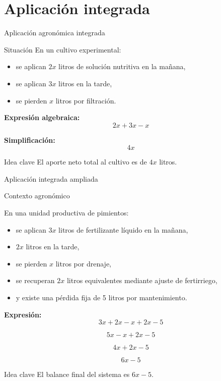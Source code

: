\documentclass[aspectratio=169,12pt]{beamer}
\newcommand{\IdeaClave}[1]{
	\begin{alertblock}{Idea clave}
		#1
	\end{alertblock}
}
\newcommand{\Agronomia}[1]{
	\begin{exampleblock}{Contexto agronómico}
		#1
	\end{exampleblock}
}
\begin{document}
	\section{Aplicación integrada}
	\begin{frame}{Aplicación agronómica integrada}
		\begin{block}{Situación}
			En un cultivo experimental:
			\begin{itemize}
				\item se aplican \(2x\) litros de solución nutritiva en la mañana,
				\pause
				\item se aplican \(3x\) litros en la tarde,
				\pause
				\item se pierden \(x\) litros por filtración.
			\end{itemize}
		\end{block}
		
		\pause
		\textbf{Expresión algebraica:}
		\[
		2x+3x-x
		\]
		
		\pause
		\textbf{Simplificación:}
		\[
		4x
		\]
		
		\pause
		\IdeaClave{El aporte neto total al cultivo es de \(4x\) litros.}
	\end{frame}
	
	\begin{frame}{Aplicación integrada ampliada}
		\small
		\Agronomia{
			En una unidad productiva de pimientos:
			\begin{itemize}
				\item se aplican \(3x\) litros de fertilizante líquido en la mañana,
				\pause
				\item \(2x\) litros en la tarde,
				\pause
				\item se pierden \(x\) litros por drenaje,
				\pause
				\item se recuperan \(2x\) litros equivalentes mediante ajuste de fertirriego,
				\pause
				\item y existe una pérdida fija de 5 litros por mantenimiento.
			\end{itemize}
		}
		
		\pause
		\textbf{Expresión:}
		\[
		3x+2x-x+2x-5
		\]
		
		\pause
		\[
		5x-x+2x-5
		\]
		
		\pause
		\[
		4x+2x-5
		\]
		
		\pause
		\[
		6x-5
		\]
		
		\pause
		\IdeaClave{El balance final del sistema es \(6x-5\).}
	\end{frame}
	
\end{document}
